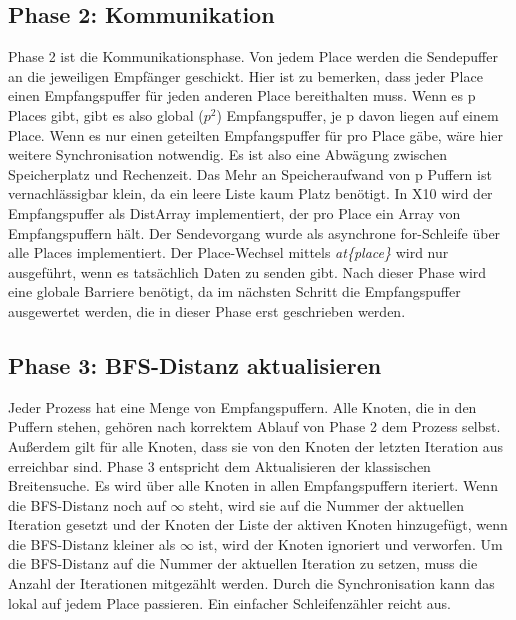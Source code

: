 \subsection{Phase 2: Kommunikation} %
\label{sub:parallel_phase_2}
Phase 2 ist die Kommunikationsphase. Von jedem Place werden die Sendepuffer an die jeweiligen Empfänger geschickt. Hier ist zu bemerken, dass jeder Place einen Empfangspuffer für jeden anderen Place bereithalten muss. Wenn es p Places gibt, gibt es also global ($p^2$) Empfangspuffer, je p davon liegen auf einem Place. Wenn es nur einen geteilten Empfangspuffer für pro Place gäbe, wäre hier weitere Synchronisation notwendig. Es ist also eine Abwägung zwischen Speicherplatz und Rechenzeit. Das Mehr an Speicheraufwand von p Puffern ist vernachlässigbar klein, da ein leere Liste kaum Platz benötigt. In X10 wird der Empfangspuffer als DistArray implementiert, der pro Place ein Array von Empfangspuffern hält. Der Sendevorgang wurde als asynchrone for-Schleife über alle Places implementiert. Der Place-Wechsel mittels \textit{at\{place\}} wird nur ausgeführt, wenn es tatsächlich Daten zu senden gibt. Nach dieser Phase wird eine globale Barriere benötigt, da im nächsten Schritt die Empfangspuffer ausgewertet werden, die in dieser Phase erst geschrieben werden.

\subsection{Phase 3: BFS-Distanz aktualisieren} %
\label{sub:phase_3}
Jeder Prozess hat eine Menge von Empfangspuffern. Alle Knoten, die in den Puffern stehen, gehören nach korrektem Ablauf von Phase 2 dem Prozess selbst. Außerdem gilt für alle Knoten, dass sie von den Knoten der letzten Iteration aus erreichbar sind. Phase 3 entspricht dem Aktualisieren der klassischen Breitensuche. Es wird über alle Knoten in allen Empfangspuffern iteriert. Wenn die BFS-Distanz noch auf $\infty$ steht, wird sie auf die Nummer der aktuellen Iteration gesetzt und der Knoten der Liste der aktiven Knoten hinzugefügt, wenn die BFS-Distanz kleiner als $\infty$ ist, wird der Knoten ignoriert und verworfen. 
Um die BFS-Distanz auf die Nummer der aktuellen Iteration zu setzen, muss die Anzahl der Iterationen mitgezählt werden. Durch die Synchronisation kann das lokal auf jedem Place passieren. Ein einfacher Schleifenzähler reicht aus.


